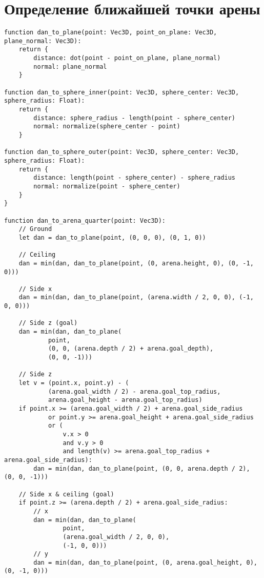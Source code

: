 \section{Определение ближайшей точки арены}

\begin{verbatim}
function dan_to_plane(point: Vec3D, point_on_plane: Vec3D, plane_normal: Vec3D):
    return {
        distance: dot(point - point_on_plane, plane_normal)
        normal: plane_normal
    }

function dan_to_sphere_inner(point: Vec3D, sphere_center: Vec3D, sphere_radius: Float):
    return {
        distance: sphere_radius - length(point - sphere_center)
        normal: normalize(sphere_center - point)
    }

function dan_to_sphere_outer(point: Vec3D, sphere_center: Vec3D, sphere_radius: Float):
    return {
        distance: length(point - sphere_center) - sphere_radius
        normal: normalize(point - sphere_center)
    }
}

function dan_to_arena_quarter(point: Vec3D):
    // Ground
    let dan = dan_to_plane(point, (0, 0, 0), (0, 1, 0))

    // Ceiling
    dan = min(dan, dan_to_plane(point, (0, arena.height, 0), (0, -1, 0)))

    // Side x
    dan = min(dan, dan_to_plane(point, (arena.width / 2, 0, 0), (-1, 0, 0)))

    // Side z (goal)
    dan = min(dan, dan_to_plane(
            point,
            (0, 0, (arena.depth / 2) + arena.goal_depth),
            (0, 0, -1)))

    // Side z
    let v = (point.x, point.y) - (
            (arena.goal_width / 2) - arena.goal_top_radius,
            arena.goal_height - arena.goal_top_radius)
    if point.x >= (arena.goal_width / 2) + arena.goal_side_radius
            or point.y >= arena.goal_height + arena.goal_side_radius
            or (
                v.x > 0
                and v.y > 0
                and length(v) >= arena.goal_top_radius + arena.goal_side_radius):
        dan = min(dan, dan_to_plane(point, (0, 0, arena.depth / 2), (0, 0, -1)))

    // Side x & ceiling (goal)
    if point.z >= (arena.depth / 2) + arena.goal_side_radius:
        // x
        dan = min(dan, dan_to_plane(
                point,
                (arena.goal_width / 2, 0, 0),
                (-1, 0, 0)))
        // y
        dan = min(dan, dan_to_plane(point, (0, arena.goal_height, 0), (0, -1, 0)))


\end{verbatim}
